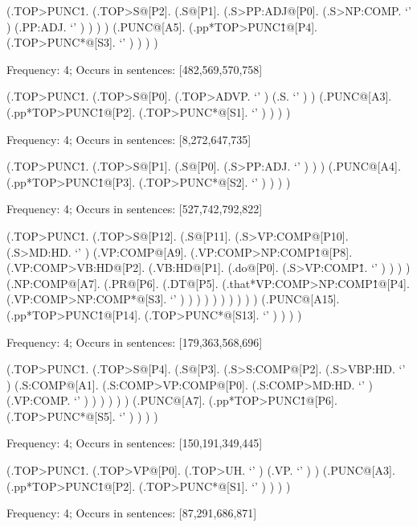 \documentclass[10pt]{article}
\begin{document}
\begin{parsetree} (.TOP>PUNC\^1. (.TOP>S@[P2]. (.S@[P1]. (.S>PP:ADJ@[P0]. (.S>NP:COMP. `' ) (.PP:ADJ. `' ) ) ) ) (.PUNC@[A5]. (.pp*TOP>PUNC\^1@[P4]. (.TOP>PUNC*@[S3]. `' ) ) ) ) \end{parsetree}

Frequency: 4; Occurs in sentences: [482,569,570,758]


\begin{parsetree} (.TOP>PUNC\^1. (.TOP>S@[P0]. (.TOP>ADVP. `' ) (.S. `' ) ) (.PUNC@[A3]. (.pp*TOP>PUNC\^1@[P2]. (.TOP>PUNC*@[S1]. `' ) ) ) ) \end{parsetree}

Frequency: 4; Occurs in sentences: [8,272,647,735]


\begin{parsetree} (.TOP>PUNC\^1. (.TOP>S@[P1]. (.S@[P0]. (.S>PP:ADJ. `' ) ) ) (.PUNC@[A4]. (.pp*TOP>PUNC\^1@[P3]. (.TOP>PUNC*@[S2]. `' ) ) ) ) \end{parsetree}

Frequency: 4; Occurs in sentences: [527,742,792,822]


\begin{parsetree} (.TOP>PUNC\^1. (.TOP>S@[P12]. (.S@[P11]. (.S>VP:COMP@[P10]. (.S>MD:HD. `' ) (.VP:COMP@[A9]. (.VP:COMP>NP:COMP\^1@[P8]. (.VP:COMP>VB:HD@[P2]. (.VB:HD@[P1]. (.do@[P0]. (.S>VP:COMP\^1. `' ) ) ) ) (.NP:COMP@[A7]. (.PR@[P6]. (.DT@[P5]. (.that*VP:COMP>NP:COMP\^1@[P4]. (.VP:COMP>NP:COMP*@[S3]. `' ) ) ) ) ) ) ) ) ) ) (.PUNC@[A15]. (.pp*TOP>PUNC\^1@[P14]. (.TOP>PUNC*@[S13]. `' ) ) ) ) \end{parsetree}

Frequency: 4; Occurs in sentences: [179,363,568,696]


\begin{parsetree} (.TOP>PUNC\^1. (.TOP>S@[P4]. (.S@[P3]. (.S>S:COMP@[P2]. (.S>VBP:HD. `' ) (.S:COMP@[A1]. (.S:COMP>VP:COMP@[P0]. (.S:COMP>MD:HD. `' ) (.VP:COMP. `' ) ) ) ) ) ) (.PUNC@[A7]. (.pp*TOP>PUNC\^1@[P6]. (.TOP>PUNC*@[S5]. `' ) ) ) ) \end{parsetree}

Frequency: 4; Occurs in sentences: [150,191,349,445]


\begin{parsetree} (.TOP>PUNC\^1. (.TOP>VP@[P0]. (.TOP>UH. `' ) (.VP. `' ) ) (.PUNC@[A3]. (.pp*TOP>PUNC\^1@[P2]. (.TOP>PUNC*@[S1]. `' ) ) ) ) \end{parsetree}

Frequency: 4; Occurs in sentences: [87,291,686,871]
\end{document}
